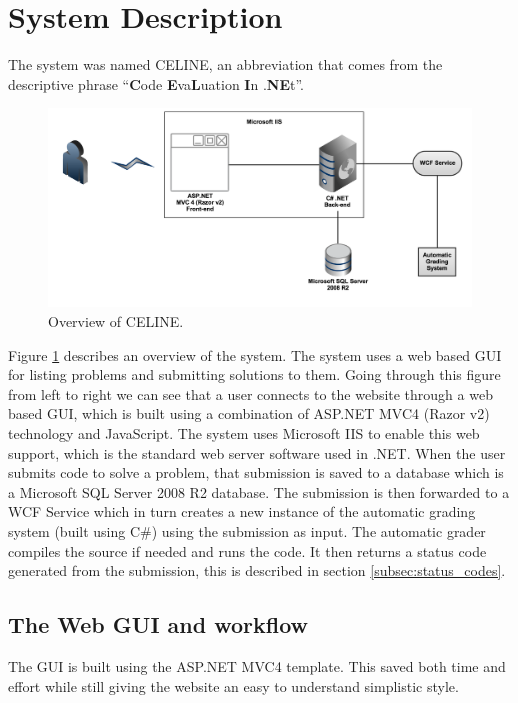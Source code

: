 \section{System Description}
The system was named CELINE, an abbreviation that comes from the descriptive phrase ``\textbf{C}ode \textbf{E}va\textbf{L}uation \textbf{I}n .\textbf{NE}t''.

\begin{figure}[h]
	\centering
	\includegraphics[width=0.9\linewidth]{chapters/media/overview.png}
	\caption{Overview of CELINE.}
	\label{fig:SystemOverview}
\end{figure}

Figure \ref{fig:SystemOverview} describes an overview of the system. The system uses a web based GUI for listing problems and submitting solutions to them. Going through this figure from left to right we can see that a user connects to the website through a web based GUI, which is built using a combination of ASP.NET MVC4 (Razor v2) technology and JavaScript. The system uses Microsoft IIS to enable this web support, which is the standard web server software used in .NET. When the user submits code to solve a problem, that submission is saved to a database which is a Microsoft SQL Server 2008 R2 database. The submission is then forwarded to a WCF Service which in turn creates a new instance of the automatic grading system (built using C\#) using the submission as input. The automatic grader compiles the source if needed and runs the code. It then returns a status code generated from the submission, this is described in section \ref{subsec:status_codes}.


\subsection{The Web GUI and workflow}
The GUI is built using the ASP.NET MVC4 template. This saved both time and effort while still giving the website an easy to understand simplistic style.

